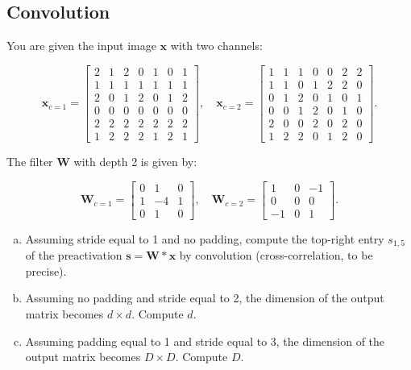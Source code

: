 \documentclass{article}
\begin{document}
\subsection*{Convolution}

You are given the input image \(\mathbf{x}\) with two channels:

\[
\mathbf{x}_{c=1} =
\begin{bmatrix}
2 & 1 & 2 & 0 & 1 & 0 & 1 \\
1 & 1 & 1 & 1 & 1 & 1 & 1 \\
2 & 0 & 1 & 2 & 0 & 1 & 2 \\
0 & 0 & 0 & 0 & 0 & 0 & 0 \\
2 & 2 & 2 & 2 & 2 & 2 & 2 \\
1 & 2 & 2 & 2 & 1 & 2 & 1
\end{bmatrix},
\quad
\mathbf{x}_{c=2} =
\begin{bmatrix}
1 & 1 & 1 & 0 & 0 & 2 & 2 \\
1 & 1 & 0 & 1 & 2 & 2 & 0 \\
0 & 1 & 2 & 0 & 1 & 0 & 1 \\
0 & 0 & 1 & 2 & 0 & 1 & 0 \\
2 & 0 & 0 & 2 & 0 & 2 & 0 \\
1 & 2 & 2 & 0 & 1 & 2 & 0
\end{bmatrix}.
\]

The filter \(\mathbf{W}\) with depth 2 is given by:

\[
\mathbf{W}_{c=1} =
\begin{bmatrix}
0 & 1 & 0 \\
1 & -4 & 1 \\
0 & 1 & 0
\end{bmatrix},
\quad
\mathbf{W}_{c=2} =
\begin{bmatrix}
1 & 0 & -1 \\
0 & 0 & 0 \\
-1 & 0 & 1
\end{bmatrix}.
\]

\begin{enumerate}[(a)]
    \item Assuming stride equal to 1 and no padding, compute the top-right entry \(s_{1,5}\) of the preactivation \(\mathbf{s} = \mathbf{W} * \mathbf{x}\) by convolution (cross-correlation, to be precise).
    \item Assuming no padding and stride equal to 2, the dimension of the output matrix becomes \(d \times d\). Compute \(d\).
    \item Assuming padding equal to 1 and stride equal to 3, the dimension of the output matrix becomes \(D \times D\). Compute \(D\).
\end{enumerate}
\end{document}

